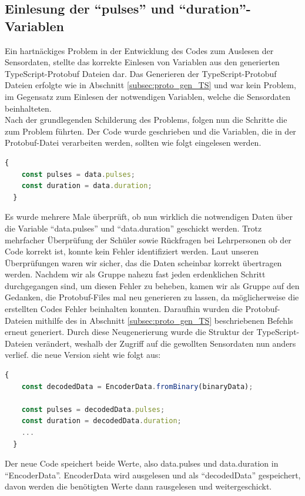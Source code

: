 \subsection{Einlesung der ``pulses'' und ``duration''-Variablen}
\label{subsubsec:problem_variablen_einlesen}
Ein hartnäckiges Problem in der Entwicklung des Codes zum Auslesen der Sensordaten, 
stellte das korrekte Einlesen von Variablen aus den generierten TypeScript-Protobuf Dateien dar.
%
Das Generieren der TypeScript-Protobuf Dateien erfolgte wie in Abschnitt \ref{subsec:proto_gen_TS} 
und war kein Problem, im Gegensatz zum Einlesen der notwendigen Variablen, 
welche die Sensordaten beinhalteten. 
% 
\\
Nach der grundlegenden Schilderung des Problems, folgen nun die Schritte die zum Problem führten.
%
Der Code wurde geschrieben und die Variablen, die in der Protobuf-Datei verarbeiten werden, 
sollten wie folgt eingelesen werden.
\begin{lstlisting}[language=JavaScript, gobble=4]
  {
    const pulses = data.pulses;
    const duration = data.duration;
  }
\end{lstlisting}
%
Es wurde mehrere Male überprüft, ob nun wirklich die notwendigen Daten über die Variable 
``data.pulses'' und ``data.duration'' geschickt werden. 
%
Trotz mehrfacher Überprüfung der Schüler sowie Rückfragen bei Lehrpersonen ob der Code korrekt ist, 
konnte kein Fehler identifiziert werden. 
Laut unseren Überprüfungen waren wir sicher, das die Daten scheinbar korrekt übertragen werden.
%
Nachdem wir als Gruppe nahezu fast jeden erdenklichen Schritt durchgegangen sind, um diesen Fehler zu beheben,
kamen wir als Gruppe auf den Gedanken, die Protobuf-Files mal neu generieren zu lassen, da möglicherweise 
die erstellten Codes Fehler beinhalten konnten. 
%
Daraufhin wurden die Protobuf-Dateien mithilfe des in Abschnitt \ref{subsec:proto_gen_TS} beschriebenen
Befehls erneut generiert.
%
Durch diese Neugenerierung wurde die Struktur der TypeScript-Dateien verändert, 
weshalb der Zugriff auf die gewollten Sensordaten nun anders verlief.
%
die neue Version sieht wie folgt aus:
\begin{lstlisting}[language=JavaScript, gobble=4]
  {
    const decodedData = EncoderData.fromBinary(binaryData);

    const pulses = decodedData.pulses;
    const duration = decodedData.duration;
    ...
  }
\end{lstlisting}
Der neue Code speichert beide Werte, also data.pulses und data.duration in ``EncoderData''.
EncoderData wird ausgelesen und als ``decodedData'' gespeichert, davon werden die benötigten Werte
dann rausgelesen und weitergeschickt.

